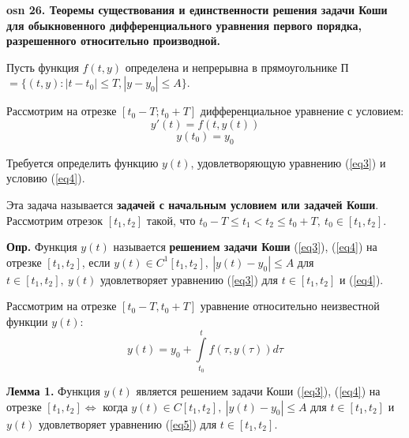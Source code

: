 \setcounter{section}{15}
\setcounter{subsection}{26}
\setcounter{equation}{0}
\textbf{\LARGE osn 26. Теоремы существования и единственности решения задачи Коши для обыкновенного дифференциального уравнения первого порядка, разрешенного относительно производной.}

Пусть функция $f(t,y)$ определена и непрерывна в прямоугольнике 
П$ = \{(t, y) : |t - t_0| \leqslant T, |y - y_0| \leqslant A\}$.

Рассмотрим на отрезке $[t_0 - T ; t_0 + T ]$ дифференциальное уравнение с условием:
\begin{equation}
    y'(t) = f(t, y(t))
    \label{eq3}
\end{equation}
\begin{equation}
    y(t_0) = y_0
    \label{eq4}
\end{equation}

Требуется определить функцию $y(t)$, удовлетворяющую уравнению (\ref{eq3}) и условию (\ref{eq4}).

Эта задача называется \textbf{задачей с начальным условием или задачей Коши}. Рассмотрим отрезок $[t_1, t_2]$ такой, что $t_0 - T \leqslant t_1 < t_2 \leqslant t_0 + T,~t_0 \in [t_1, t_2]$.

\textbf{Опр.} Функция $y(t)$ называется \textbf{решением задачи Коши} (\ref{eq3}), (\ref{eq4}) на отрезке $[t_1, t_2]$, если $y(t) \in C^1[t_1, t_2],~|y(t) - y_0| \leqslant A$ для $t \in [t_1, t_2],~y(t)$ удовлетворяет уравнению (\ref{eq3}) для $t \in [t_1, t_2]$ и (\ref{eq4}).

Рассмотрим на отрезке $[t_0 - T,t_0 + T]$ уравнение относительно неизвестной функции $y(t)$:
\begin{equation}
    y(t) = y_0 + \int\limits_{t_0}^{t}f(\tau, y(\tau))d\tau
    \label{eq5}
\end{equation}

\textbf{Лемма 1.} Функция $y(t)$ является решением задачи Коши (\ref{eq3}), (\ref{eq4}) на отрезке $[t_1, t_2] \iff$ когда $y(t) \in C[t_1, t_2],~|y(t) - y_0| \leqslant A$ для $t \in [t_1, t_2]$ и $y(t)$ удовлетворяет уравнению (\ref{eq5}) для $t \in [t_1, t_2]$.

